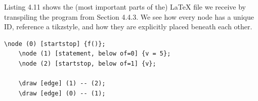 Listing 4.11 shows the (most important parts of the) LaTeX file we receive by transpiling the program from Section 4.4.3. We see how every node has a unique ID, reference a tikzstyle, and how they are explicitly placed beneath each other. \hfill \\

\begin{lstlisting}[caption={The LaTeX from transpiling a program to IBP}, captionpos=b]
    \node (0) [startstop] {f()};
    \node (1) [statement, below of=0] {v = 5};
    \node (2) [startstop, below of=1] {v};

    \draw [edge] (1) -- (2);
    \draw [edge] (0) -- (1);
\end{lstlisting}
